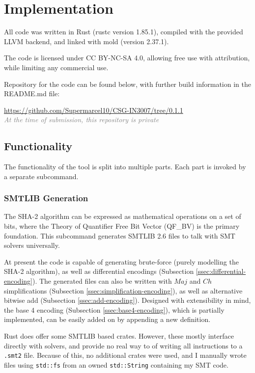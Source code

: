 \documentclass[a4paper]{report}
\begin{document}
\section{Implementation}
\label{sec:implementation}
All code was written in Rust (rustc version 1.85.1), compiled with the provided LLVM backend, and linked with mold (version 2.37.1). \cite{rust} \cite{mold}

The code is licensed under CC BY-NC-SA 4.0, allowing free use with attribution, while limiting any commercial use. \cite{cc_by-nc-sa}

Repository for the code can be found below, with further build information in the README.md file:
\begin{center}
	\url{https://github.com/Supermarcel10/CSG-IN3007/tree/0.1.1} \\
	\textcolor{gray}{\textit{At the time of submission, this repository is private}}
\end{center}

\subsection{Functionality}
The functionality of the tool is split into multiple parts.
Each part is invoked by a separate subcommand.

\subsubsection{SMTLIB Generation}
\label{sssec:smtlib-generation}
The SHA-2 algorithm can be expressed as mathematical operations on a set of bits, where the Theory of Quantifier Free Bit Vector (QF\_BV) is the primary foundation.
This subcommand generates SMTLIB 2.6 files to talk with SMT solvers universally.

At present the code is capable of generating brute-force (purely modelling the SHA-2 algorithm), as well as differential encodings (Subsection \ref{ssec:differential-encoding}).
The generated files can also be written with $Maj$ and $Ch$ simplifications (Subsection \ref{ssec:simplification-encoding}), as well as alternative bitwise add (Subsection \ref{ssec:add-encoding}).
Designed with extensibility in mind, the base 4 encoding (Subsection \ref{ssec:base4-encoding}), which is partially implemented, can be easily added on by appending a new definition.

Rust does offer some SMTLIB based crates. \cite{cargo:smtlib}
However, these mostly interface directly with solvers, and provide no real way to of writing all instructions to a \texttt{.smt2} file.
Because of this, no additional crates were used, and I manually wrote files using \texttt{std::fs} from an owned \texttt{std::String} containing my SMT code.
\end{document}
